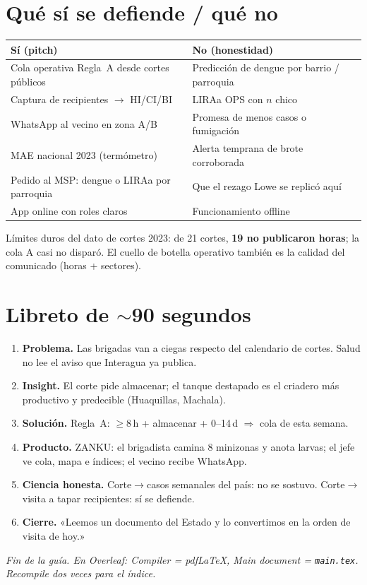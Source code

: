 \documentclass[11pt,a4paper]{article}
\begin{document}
\section{Qué sí se defiende / qué no}

\begin{longtable}{@{}p{6.2cm}p{6.2cm}@{}}
\toprule
\textbf{Sí (pitch)} & \textbf{No (honestidad)}\\
\midrule
\endhead
Cola operativa Regla~A desde cortes públicos & Predicción de dengue por
barrio / parroquia\\
Captura de recipientes $\rightarrow$ HI/CI/BI & LIRAa OPS con $n$ chico\\
WhatsApp al vecino en zona A/B & Promesa de menos casos o fumigación\\
MAE nacional 2023 (termómetro) & Alerta temprana de brote corroborada\\
Pedido al MSP: dengue o LIRAa por parroquia & Que el rezago Lowe se
replicó aquí\\
App online con roles claros & Funcionamiento offline\\
\bottomrule
\end{longtable}

Límites duros del dato de cortes 2023: de 21 cortes, \textbf{19 no
publicaron horas}; la cola A casi no disparó. El cuello de botella
operativo también es la calidad del comunicado (horas + sectores).

\section{Libreto de $\sim$90 segundos}

\begin{enumerate}[leftmargin=1.4em]
  \item \textbf{Problema.} Las brigadas van a ciegas respecto del
        calendario de cortes. Salud no lee el aviso que Interagua ya
        publica.
  \item \textbf{Insight.} El corte pide almacenar; el tanque destapado
        es el criadero más productivo y predecible (Huaquillas,
        Machala).
  \item \textbf{Solución.} Regla~A: $\geq 8$\,h + almacenar + 0--14\,d
        $\Rightarrow$ cola de esta semana.
  \item \textbf{Producto.} ZANKU: el brigadista camina 8 minizonas y
        anota larvas; el jefe ve cola, mapa e índices; el vecino recibe
        WhatsApp.
  \item \textbf{Ciencia honesta.} Corte$\to$casos semanales del país: no
        se sostuvo. Corte$\to$visita a tapar recipientes: sí se defiende.
  \item \textbf{Cierre.} «Leemos un documento del Estado y lo convertimos
        en la orden de visita de hoy.»
\end{enumerate}

\vspace{1em}
\noindent\textit{Fin de la guía. En Overleaf: Compiler = pdfLaTeX,
Main document = \texttt{main.tex}. Recompile dos veces para el índice.}
\end{document}

